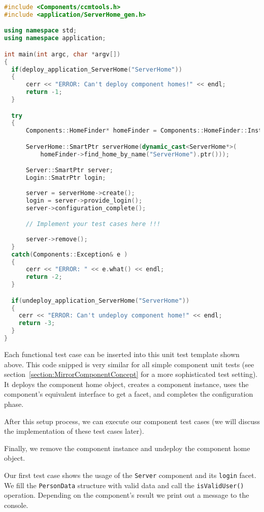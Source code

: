 \begin{footnotesize} 
\begin{lstlisting}[language=C++]
#include <Components/ccmtools.h>
#include <application/ServerHome_gen.h>

using namespace std;
using namespace application;

int main(int argc, char *argv[])
{
  if(deploy_application_ServerHome("ServerHome")) 
  {
      cerr << "ERROR: Can't deploy component homes!" << endl;
      return -1;
  }

  try 
  {
      Components::HomeFinder* homeFinder = Components::HomeFinder::Instance();

      ServerHome::SmartPtr serverHome(dynamic_cast<ServerHome*>(
          homeFinder->find_home_by_name("ServerHome").ptr()));

      Server::SmartPtr server;
      Login::SmatrPtr login;
      
      server = serverHome->create();
      login = server->provide_login();
      server->configuration_complete();

      // Implement your test cases here !!!
    
      server->remove();
  } 
  catch(Components::Exception& e ) 
  {
      cerr << "ERROR: " << e.what() << endl;
      return -2;
  } 

  if(undeploy_application_ServerHome("ServerHome")) 
  {
    cerr << "ERROR: Can't undeploy component home!" << endl;
    return -3;
  }
}
\end{lstlisting}
\end{footnotesize}

Each functional test case can be inserted into this unit test template shown above.
This code snipped is very similar for all simple component unit tests 
(see section~\ref{section:MirrorComponentConcept} for a more sophisticated test
setting).
It deploys the component home object, creates a component instance, uses 
the component's equivalent interface to get a facet, and completes the
configuration phase. 

\vspace{3mm}
After this setup process, we can execute our component test cases (we will
discuss the implementation of these test cases later).

\vspace{3mm}
Finally, we remove the component instance and undeploy the component home object.


\vspace{3mm}
Our first test case shows the usage of the {\tt Server} component and its 
{\tt login} facet. 
We fill the {\tt PersonData} structure with valid data and call the
{\tt isValidUser()} operation. Depending on the component's result we print out
a message to the console.

